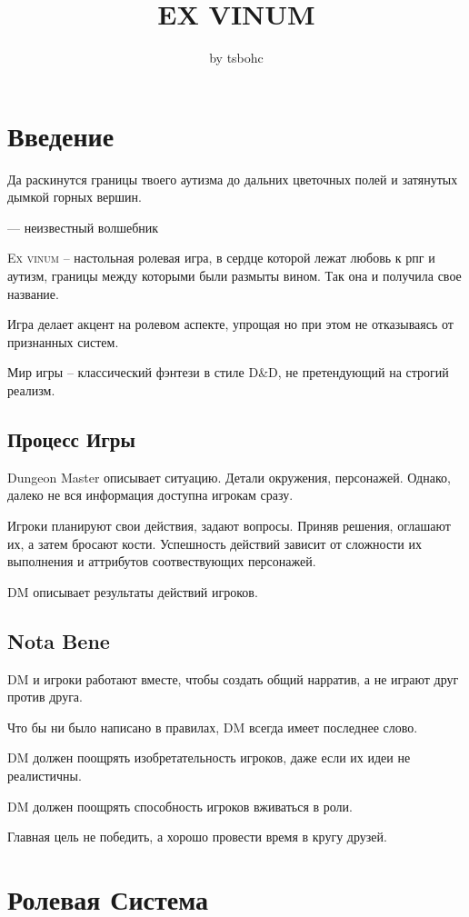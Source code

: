 \documentclass[a4paper,12pt,twocolumn]{book}
\title{\textbf{EX VINUM}}
\author{by tsbohc}
\date{}
\begin{document}
\maketitle
\tableofcontents

\chapter{Введение}
\epigraph{Да раскинутся границы твоего аутизма до дальних цветочных полей и затянутых дымкой горных вершин.}{--- неизвестный волшебник}

\lettrine[lines=2]{E}{x vinum} -- настольная ролевая игра, в сердце которой лежат любовь к рпг и аутизм, границы между которыми были размыты вином. Так она и получила свое название.

Игра делает акцент на ролевом аспекте, упрощая но при этом не отказываясь от признанных систем.

Мир игры -- классический фэнтези в стиле D\&D, не претендующий на строгий реализм.


\section{Процесс Игры}
Dungeon Master описывает ситуацию. Детали окружения, персонажей. Однако, далеко не вся информация доступна игрокам сразу.

Игроки планируют свои действия, задают вопросы. Приняв решения, оглашают их, а затем бросают кости. Успешность действий зависит от сложности их выполнения и аттрибутов соотвествующих персонажей.

DM описывает результаты действий игроков.


\section{Nota Bene}
DM и игроки работают вместе, чтобы создать общий нарратив, а не играют друг против друга.

Что бы ни было написано в правилах, DM всегда имеет последнее слово.

DM должен поощрять изобретательность игроков, даже если их идеи не реалистичны.

DM должен поощрять способность игроков вживаться в роли.

Главная цель не победить, а хорошо провести время в кругу друзей.

\chapter{Ролевая Система}
\end{document}

